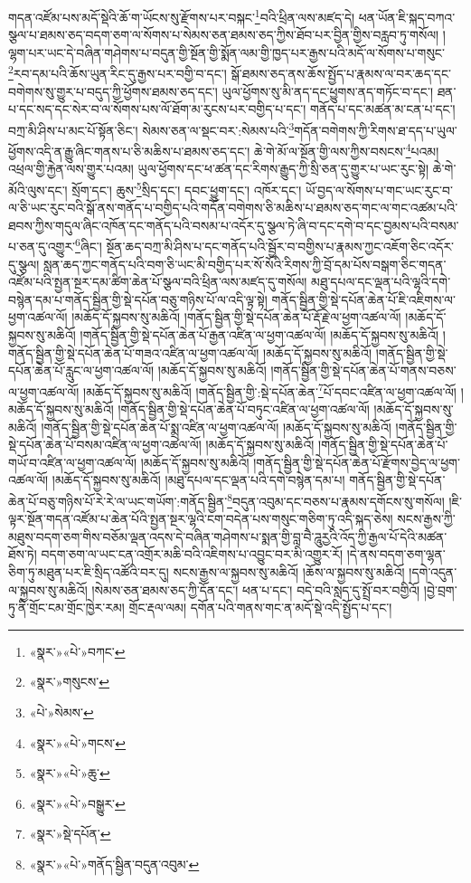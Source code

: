 གདན་འཛོམ་པས་མདོ་སྡེའི་ཆོ་ག་ཡོངས་སུ་རྫོགས་པར་བསྐང་\footnote{«སྣར་»«པེ་»བཀང་}བའི་ཕྲིན་ལས་མཛད་དེ། ཕན་ཡོན་ཇི་སྐད་བཀའ་སྩལ་པ་ཐམས་ཅད་བདག་ཅག་ལ་སོགས་པ་སེམས་ཅན་ཐམས་ཅད་ཀྱིས་ཐོབ་པར་བྱིན་གྱིས་བརླབ་ཏུ་གསོལ། །ལྷག་པར་ཡང་དེ་བཞིན་གཤེགས་པ་བདུན་གྱི་སྔོན་གྱི་སྨོན་ལམ་གྱི་ཁྱད་པར་རྒྱས་པའི་མདོ་ལ་སོགས་པ་གསུང་\footnote{«སྣར་»གསུངས་}རབ་དམ་པའི་ཆོས་ཡུན་རིང་དུ་རྒྱས་པར་བགྱི་བ་དང་། སྒོ་ཐམས་ཅད་ནས་ཆོས་སྤྱོད་པ་རྣམས་ལ་བར་ཆད་དང་བགེགས་སུ་གྱུར་པ་བདུད་ཀྱི་ཕྱོགས་ཐམས་ཅད་དང་། ཡུལ་ཕྱོགས་སུ་མི་ནད་དང་ཕྱུགས་ནད་གཏོང་བ་དང་། ཐན་པ་དང་སད་དང་སེར་བ་ལ་སོགས་པས་ལོ་ཐོག་མ་རུངས་པར་བགྱིད་པ་དང་། གནོད་པ་དང་མཚན་མ་ངན་པ་དང་། བཀྲ་མི་ཤིས་པ་མང་པོ་སྟོན་ཅིང་། སེམས་ཅན་ལ་སྡང་བར་:སེམས་པའི་\footnote{«པེ་»སེམས་}གདོན་བགེགས་ཀྱི་རིགས་ཐ་དད་པ་ཡུལ་ཕྱོགས་འདི་ན་རྒྱུ་ཞིང་གནས་པ་ཅི་མཆིས་པ་ཐམས་ཅད་དང་། ཆེ་གེ་མོ་ལ་སྔོན་གྱི་ལས་ཀྱིས་བསངས་\footnote{«སྣར་»«པེ་»གངས་}པའམ། འཕྲལ་གྱི་རྐྱེན་ལས་གྱུར་པའམ། ཡུལ་ཕྱོགས་དང་ཕ་ཚན་དང་རིགས་རྒྱུད་ཀྱི་སྲི་ཅན་དུ་གྱུར་པ་ཡང་རུང་སྟེ། ཆེ་གེ་མོའི་ལུས་དང་། སྲོག་དང་། ཆུས་\footnote{«སྣར་»«པེ་»ཆུ་}སྲིད་དང་། དབང་ཕྱུག་དང་། འཁོར་དང་། ཡོ་བྱད་ལ་སོགས་པ་གང་ཡང་རུང་བ་ལ་ཅི་ཡང་རུང་བའི་སྒོ་ནས་གནོད་པ་བགྱིད་པའི་གདོན་བགེགས་ཅི་མཆིས་པ་ཐམས་ཅད་གང་ལ་གང་འཚམ་པའི་ཐབས་ཀྱིས་གདུལ་ཞིང་འཁོན་དང་གནོད་པའི་བསམ་པ་འདོར་དུ་སྩལ་ཏེ་ཞི་བ་དང་དགེ་བ་དང་བྱམས་པའི་བསམ་པ་ཅན་དུ་འགྱུར་\footnote{«སྣར་»«པེ་»བསྒྱུར་}ཞིང་། སྔོན་ཆད་བཀྲ་མི་ཤིས་པ་དང་གནོད་པའི་སྦྱོར་བ་བགྱིས་པ་རྣམས་ཀྱང་འཇོག་ཅིང་འདོར་དུ་སྩལ། སླན་ཆད་ཀྱང་གནོད་པའི་བག་ཅི་ཡང་མི་བགྱིད་པར་སོ་སོའི་རིགས་ཀྱི་བྲོ་དམ་པོས་བསྒག་ཅིང་གདན་འཛོམ་པའི་སྤྱན་སྔར་དམ་ཚིག་ཆེན་པོ་སྩལ་བའི་ཕྲིན་ལས་མཛད་དུ་གསོལ། མཐུ་དཔལ་དང་ལྡན་པའི་ལྷའི་དགེ་བསྙེན་དམ་པ་གནོད་སྦྱིན་གྱི་སྡེ་དཔོན་བཅུ་གཉིས་པོ་ལ་འདི་ལྟ་སྟེ། གནོད་སྦྱིན་གྱི་སྡེ་དཔོན་ཆེན་པོ་ཇི་འཇིགས་ལ་ཕྱག་འཚལ་ལོ། །མཆོད་དོ་སྐྱབས་སུ་མཆིའོ། །གནོད་སྦྱིན་གྱི་སྡེ་དཔོན་ཆེན་པོ་རྡོ་རྗེ་ལ་ཕྱག་འཚལ་ལོ། །མཆོད་དོ་སྐྱབས་སུ་མཆིའོ། །གནོད་སྦྱིན་གྱི་སྡེ་དཔོན་ཆེན་པོ་རྒྱན་འཛིན་ལ་ཕྱག་འཚལ་ལོ། །མཆོད་དོ་སྐྱབས་སུ་མཆིའོ། །གནོད་སྦྱིན་གྱི་སྡེ་དཔོན་ཆེན་པོ་གཟའ་འཛིན་ལ་ཕྱག་འཚལ་ལོ། །མཆོད་དོ་སྐྱབས་སུ་མཆིའོ། །གནོད་སྦྱིན་གྱི་སྡེ་དཔོན་ཆེན་པོ་རླུང་ལ་ཕྱག་འཚལ་ལོ། །མཆོད་དོ་སྐྱབས་སུ་མཆིའོ། །གནོད་སྦྱིན་གྱི་སྡེ་དཔོན་ཆེན་པོ་གནས་བཅས་ལ་ཕྱག་འཚལ་ལོ། །མཆོད་དོ་སྐྱབས་སུ་མཆིའོ། །གནོད་སྦྱིན་གྱི་:སྡེ་དཔོན་ཆེན་\footnote{«སྣར་»སྡེ་དཔོན་}པོ་དབང་འཛིན་ལ་ཕྱག་འཚལ་ལོ། །མཆོད་དོ་སྐྱབས་སུ་མཆིའོ། །གནོད་སྦྱིན་གྱི་སྡེ་དཔོན་ཆེན་པོ་བཏུང་འཛིན་ལ་ཕྱག་འཚལ་ལོ། །མཆོད་དོ་སྐྱབས་སུ་མཆིའོ། །གནོད་སྦྱིན་གྱི་སྡེ་དཔོན་ཆེན་པོ་སྨྲ་འཛིན་ལ་ཕྱག་འཚལ་ལོ། །མཆོད་དོ་སྐྱབས་སུ་མཆིའོ། །གནོད་སྦྱིན་གྱི་སྡེ་དཔོན་ཆེན་པོ་བསམ་འཛིན་ལ་ཕྱག་འཚལ་ལོ། །མཆོད་དོ་སྐྱབས་སུ་མཆིའོ། །གནོད་སྦྱིན་གྱི་སྡེ་དཔོན་ཆེན་པོ་གཡོ་བ་འཛིན་ལ་ཕྱག་འཚལ་ལོ། །མཆོད་དོ་སྐྱབས་སུ་མཆིའོ། །གནོད་སྦྱིན་གྱི་སྡེ་དཔོན་ཆེན་པོ་རྫོགས་བྱེད་ལ་ཕྱག་འཚལ་ལོ། །མཆོད་དོ་སྐྱབས་སུ་མཆིའོ། །མཐུ་དཔལ་དང་ལྡན་པའི་དགེ་བསྙེན་དམ་པ། གནོད་སྦྱིན་གྱི་སྡེ་དཔོན་ཆེན་པོ་བཅུ་གཉིས་པོ་རེ་རེ་ལ་ཡང་གཡོག་:གནོད་སྦྱིན་\footnote{«སྣར་»«པེ་»གནོད་སྦྱིན་བདུན་འབུམ་}བདུན་འབུམ་དང་བཅས་པ་རྣམས་དགོངས་སུ་གསོལ། །ཇི་ལྟར་སྔོན་གདན་འཛོམ་པ་ཆེན་པོའི་སྤྱན་སྔར་ལྷའི་ངག་བདེན་པས་གསུང་གཅིག་ཏུ་འདི་སྐད་ཅེས། སངས་རྒྱས་ཀྱི་མཐུས་བདག་ཅག་གིས་བཅོམ་ལྡན་འདས་དེ་བཞིན་གཤེགས་པ་སྨན་གྱི་བླ་བཻ་ཌཱུརྱའི་འོད་ཀྱི་རྒྱལ་པོ་དེའི་མཚན་ཐོས་ཏེ། བདག་ཅག་ལ་ཡང་ངན་འགྲོར་མཆི་བའི་འཇིགས་པ་འབྱུང་བར་མི་འགྱུར་རོ། །དེ་ནས་བདག་ཅག་ལྷན་ཅིག་ཏུ་མཐུན་པར་ཇི་སྲིད་འཚོའི་བར་དུ། སངས་རྒྱས་ལ་སྐྱབས་སུ་མཆིའོ། །ཆོས་ལ་སྐྱབས་སུ་མཆིའོ། །དགེ་འདུན་ལ་སྐྱབས་སུ་མཆིའོ། །སེམས་ཅན་ཐམས་ཅད་ཀྱི་དོན་དང་། ཕན་པ་དང་། བདེ་བའི་སླད་དུ་སྤྲོ་བར་བགྱིའོ། །བྱེ་བྲག་ཏུ་ནི་གྲོང་ངམ་གྲོང་ཁྱེར་རམ། གྲོང་རྡལ་ལམ། དགོན་པའི་གནས་གང་ན་མདོ་སྡེ་འདི་སྤྱོད་པ་དང་། 